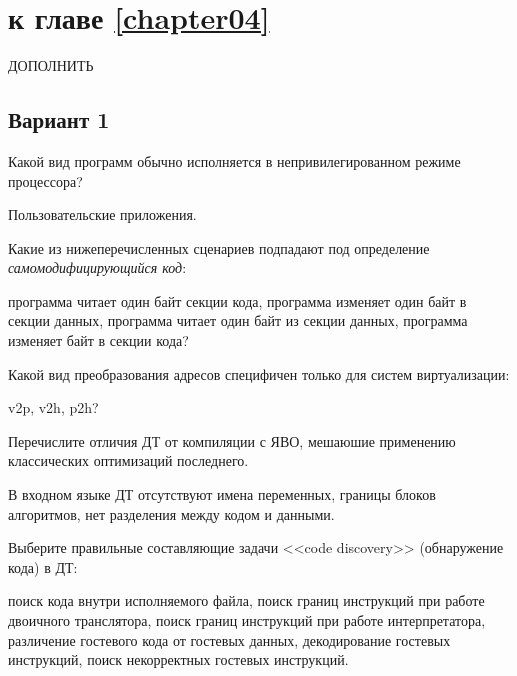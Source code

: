 \section{\Questions к главе \ref{chapter04}} %

\todo ДОПОЛНИТЬ

\subsection*{Вариант 1}

\begin{questions}


\question[3] Какой вид программ обычно исполняется в непривилегированном режиме процессора?
\begin{solution}[1cm]
Пользовательские приложения.
\end{solution}

\question[3] Какие из нижеперечисленных сценариев подпадают под определение \emph{самомодифицирующийся код}:
\begin{choices}
	\choice программа читает один байт  секции кода,
    \choice программа изменяет один байт в секции данных,
    \choice программа читает один байт из секции данных,
    \correctchoice программа изменяет байт в секции кода?
\end{choices}

\question[3] Какой вид преобразования адресов специфичен только для систем виртуализации:
\begin{choices}
    \choice v2p,
    \correctchoice v2h,
    \choice p2h?
\end{choices}


\question[3] Перечислите отличия ДТ от компиляции с ЯВО, мешаюшие применению классических оптимизаций последнего.
\begin{solution}[4cm]
В входном языке ДТ отсутствуют имена переменных, границы блоков алгоритмов, нет разделения между кодом и данными.
\end{solution}

\question[3] Выберите правильные составляющие задачи <<code discovery>> (обнаружение кода) в ДТ:
\begin{choices}
    \choice поиск кода внутри исполняемого файла,
    \correctchoice поиск границ инструкций при работе двоичного транслятора,
    \choice     поиск границ инструкций при работе интерпретатора,
    \correctchoice различение гостевого кода от гостевых данных,
    \choice     декодирование гостевых инструкций,
    \choice поиск некорректных гостевых инструкций.
\end{choices}


\end{questions}

